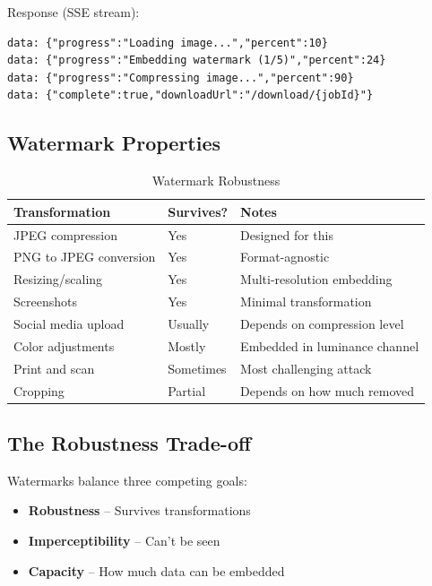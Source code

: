 \documentclass[11pt,a4paper]{article}
\begin{document}
Response (SSE stream):
\begin{verbatim}
data: {"progress":"Loading image...","percent":10}
data: {"progress":"Embedding watermark (1/5)","percent":24}
data: {"progress":"Compressing image...","percent":90}
data: {"complete":true,"downloadUrl":"/download/{jobId}"}
\end{verbatim}

\subsection{Watermark Properties}

\begin{table}[h]
\centering
\begin{tabular}{@{}L{4cm}L{2cm}L{6cm}@{}}
\toprule
\textbf{Transformation} & \textbf{Survives?} & \textbf{Notes} \\
\midrule
JPEG compression & Yes & Designed for this \\
PNG to JPEG conversion & Yes & Format-agnostic \\
Resizing/scaling & Yes & Multi-resolution embedding \\
Screenshots & Yes & Minimal transformation \\
Social media upload & Usually & Depends on compression level \\
Color adjustments & Mostly & Embedded in luminance channel \\
Print and scan & Sometimes & Most challenging attack \\
Cropping & Partial & Depends on how much removed \\
\bottomrule
\end{tabular}
\caption{Watermark Robustness}
\end{table}

\subsection{The Robustness Trade-off}

Watermarks balance three competing goals:

\begin{itemize}
    \item \textbf{Robustness} -- Survives transformations
    \item \textbf{Imperceptibility} -- Can't be seen
    \item \textbf{Capacity} -- How much data can be embedded
\end{itemize}
\end{document}
